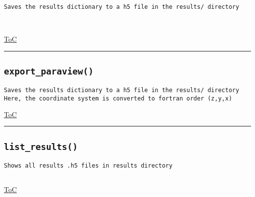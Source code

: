\documentclass{article}
\begin{document}
\begin{lstlisting}[language=docstring]
Saves the results dictionary to a h5 file in the results/ directory

    
\end{lstlisting}

\begin{flushright}

\hyperref[toc]{ToC}

\end{flushright}



\vspace{5mm}

\hrule

\subsection*{\texttt{export\_paraview()}}
\label{fun:exportparaview}

\begin{lstlisting}[language=docstring]
Saves the results dictionary to a h5 file in the results/ directory
Here, the coordinate system is converted to fortran order (z,y,x)
\end{lstlisting}

\begin{flushright}

\hyperref[toc]{ToC}

\end{flushright}



\vspace{5mm}

\hrule

\subsection*{\texttt{list\_results()}}
\label{fun:listresults}

\begin{lstlisting}[language=docstring]
Shows all results .h5 files in results directory
    
\end{lstlisting}

\begin{flushright}

\hyperref[toc]{ToC}

\end{flushright}
\end{document}
